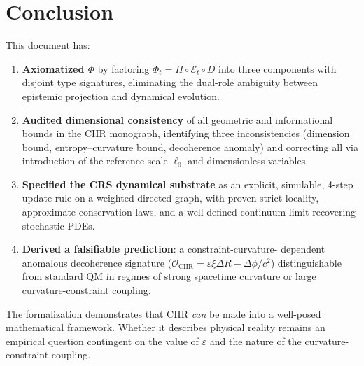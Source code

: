 \documentclass[11pt,a4paper]{article}
\theoremstyle{remark}
\begin{document}
\section{Conclusion}
\label{sec:conclusion}

This document has:

\begin{enumerate}
  \item \textbf{Axiomatized $\Phi$} by factoring
    $\Phi_t = \Pi \circ \mathcal{E}_t \circ D$ into three components
    with disjoint type signatures, eliminating the dual-role ambiguity
    between epistemic projection and dynamical evolution.

  \item \textbf{Audited dimensional consistency} of all geometric and
    informational bounds in the CIIR monograph, identifying three
    inconsistencies (dimension bound, entropy--curvature bound,
    decoherence anomaly) and correcting all via introduction of the
    reference scale $\ell_0$ and dimensionless variables.

  \item \textbf{Specified the CRS dynamical substrate} as an explicit,
    simulable, 4-step update rule on a weighted directed graph, with
    proven strict locality, approximate conservation laws, and a
    well-defined continuum limit recovering stochastic PDEs.

  \item \textbf{Derived a falsifiable prediction}: a constraint-curvature-
    dependent anomalous decoherence signature
    ($\mathcal{O}_{\mathrm{CIIR}} = \varepsilon\xi\Delta R -
    \Delta\phi/c^2$) distinguishable from standard QM in regimes of
    strong spacetime curvature or large curvature-constraint coupling.
\end{enumerate}

The formalization demonstrates that CIIR \emph{can} be made into a
well-posed mathematical framework.  Whether it describes physical
reality remains an empirical question contingent on the value of
$\varepsilon$ and the nature of the curvature-constraint coupling.
\end{document}
